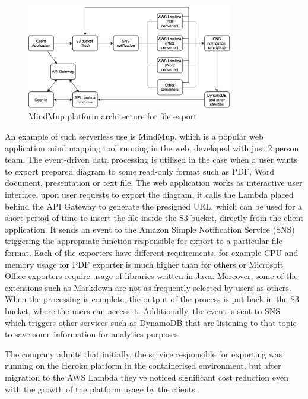 \begin{figure}[h]
    \centering
    \includegraphics[width=0.8\textwidth]{assets/02-serverless/MindMupArchitecture.png}
    \caption{MindMup platform architecture for file export}
    \label{fig:mindmup-architecture-diagram}
\end{figure}

An example of such serverless use is MindMup, which is a popular web application mind mapping tool running in the web, developed with just 2 person team. The event-driven data processing is utilised in the case when a user wants to export prepared diagram to some read-only format such as PDF, Word document, presentation or text file. The web application works as interactive user interface, upon user requests to export the diagram, it calls the Lambda placed behind the API Gateway to generate the presigned URL, which can be used for a short period of time to insert the file inside the S3 bucket, directly from the client application. It sends an event to the Amazon Simple Notification Service (SNS) triggering the appropriate function responsible for export to a particular file format. Each of the exporters have different requirements, for example CPU and memory usage for PDF exporter is much higher than for others or Microsoft Office exporters require usage of libraries written in Java. Moreover, some of the extensions such as Markdown are not as frequently selected by users as others. When the processing is complete, the output of the process is put back in the S3 bucket, where the users can access it. Additionally, the event is sent to SNS which triggers other services such as DynamoDB that are listening to that topic to save some information for analytics purposes.

The company admits that initially, the service responsible for exporting was running on the Heroku platform in the containerised environment, but after migration to the AWS Lambda they've noticed significant cost reduction even with the growth of the platform usage by the clients \cite{ServerlessApplicationsWithNodejs}.

